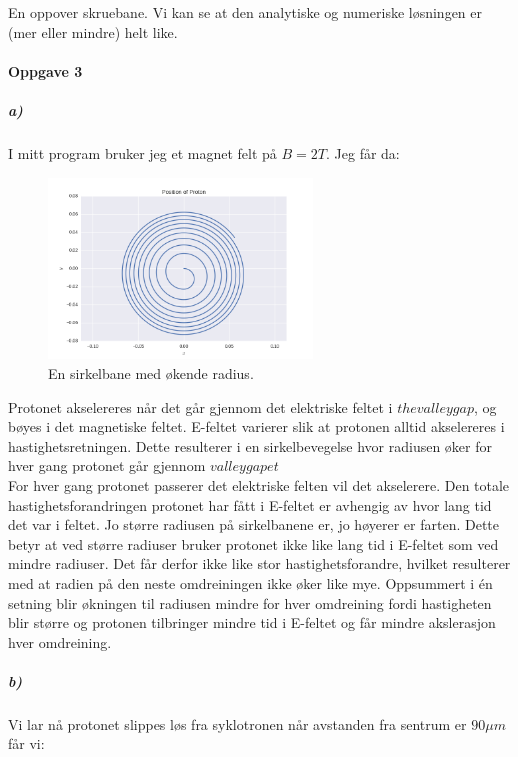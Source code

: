 \documentclass[a4paper,norsk, 10pt]{article}
\begin{document}
En oppover skruebane. Vi kan se at den analytiske og numeriske løsningen er (mer eller mindre) helt like.

\newpage

\paragraph*{Oppgave 3}
\subparagraph*{a)}
I mitt program bruker jeg et magnet felt på $B = 2T$. Jeg får da:

\begin{figure}[H]
\begin{center}
\includegraphics[width = 70mm]{opp3aPos.png}
\caption{En sirkelbane med økende radius.}
\end{center}
\end{figure}

Protonet akselereres når det går gjennom det elektriske feltet i $the valley gap$, og bøyes i det magnetiske feltet. E-feltet varierer slik at protonen alltid akselereres i hastighetsretningen. Dette resulterer i en sirkelbevegelse hvor radiusen øker for hver gang protonet går gjennom $valley gapet$\\

For hver gang protonet passerer det elektriske felten vil det akselerere. Den totale hastighetsforandringen protonet har fått i E-feltet er avhengig av hvor lang tid det var i feltet. Jo større radiusen på sirkelbanene er, jo høyerer er farten. Dette betyr at ved større radiuser bruker protonet ikke like lang tid i E-feltet som ved mindre radiuser. Det får derfor ikke like stor hastighetsforandre, hvilket resulterer med at radien på den neste omdreiningen ikke øker like mye. Oppsummert i én setning blir økningen til radiusen mindre for hver omdreining fordi hastigheten blir større og protonen tilbringer mindre tid i E-feltet og får mindre akslerasjon hver omdreining.

\subparagraph*{b)}

Vi lar nå protonet slippes løs fra syklotronen når avstanden fra sentrum er $90 \mu m$ får vi:
\end{document}
